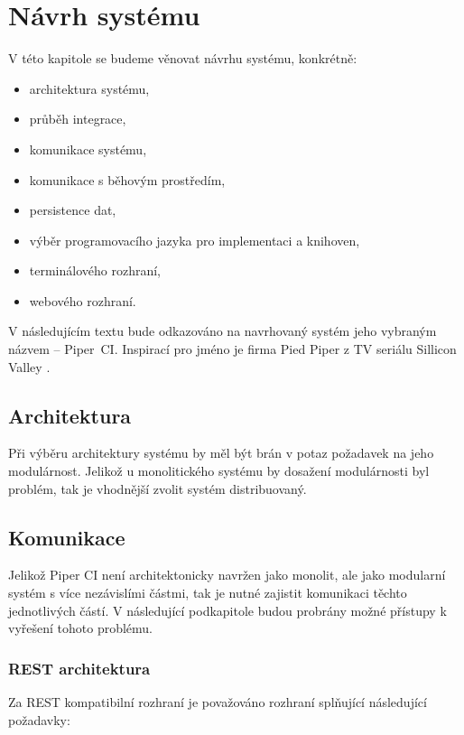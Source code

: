 \chapter{Návrh systému}

V této kapitole se budeme věnovat návrhu systému, konkrétně: 

\begin{itemize}
	\item architektura systému,
	\item průběh integrace,
	\item komunikace systému,
	\item komunikace s běhovým prostředím,
	\item persistence dat,
	\item výběr programovacího jazyka pro implementaci a knihoven,
	\item terminálového rozhraní,
	\item webového rozhraní.
\end{itemize}

V následujícím textu bude odkazováno na navrhovaný systém jeho vybraným názvem -- Piper~CI.
Inspirací pro jméno je firma Pied Piper z TV seriálu Sillicon Valley \cite{pied_piper}.

\section{Architektura}

Při výběru architektury systému by měl být brán v potaz požadavek na jeho modulárnost.
Jelikož u monolitického systému by dosažení modulárnosti byl problém, tak je vhodnější zvolit systém distribuovaný.

\section{Komunikace}

Jelikož Piper CI není architektonicky navržen jako monolit, ale jako modularní systém s více nezávislími částmi, tak je nutné zajistit komunikaci těchto jednotlivých částí.
V následující podkapitole budou probrány možné přístupy k vyřešení tohoto problému.

\subsection{REST architektura}

Za REST kompatibilní rozhraní je považováno rozhraní splňující následující požadavky:

